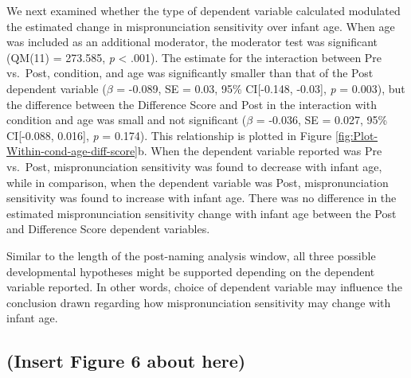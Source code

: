 \documentclass[man]{apa6}
\theoremstyle{definition}
\theoremstyle{definition}
\theoremstyle{definition}
\theoremstyle{remark}
\begin{document}
We next examined whether the type of dependent variable calculated
modulated the estimated change in mispronunciation sensitivity over
infant age. When age was included as an additional moderator, the
moderator test was significant (QM(11) = 273.585, \emph{p} \textless{}
.001). The estimate for the interaction between Pre vs.~Post, condition,
and age was significantly smaller than that of the Post dependent
variable (\(\beta\) = -0.089, SE = 0.03, 95\% CI{[}-0.148, -0.03{]},
\emph{p} = 0.003), but the difference between the Difference Score and
Post in the interaction with condition and age was small and not
significant (\(\beta\) = -0.036, SE = 0.027, 95\% CI{[}-0.088, 0.016{]},
\emph{p} = 0.174). This relationship is plotted in Figure
\ref{fig:Plot-Within-cond-age-diff-score}b. When the dependent variable
reported was Pre vs.~Post, mispronunciation sensitivity was found to
decrease with infant age, while in comparison, when the dependent
variable was Post, mispronunciation sensitivity was found to increase
with infant age. There was no difference in the estimated
mispronunciation sensitivity change with infant age between the Post and
Difference Score dependent variables.

Similar to the length of the post-naming analysis window, all three
possible developmental hypotheses might be supported depending on the
dependent variable reported. In other words, choice of dependent
variable may influence the conclusion drawn regarding how
mispronunciation sensitivity may change with infant age.

\subsection{(Insert Figure 6 about
here)}\label{insert-figure-6-about-here}
\end{document}
